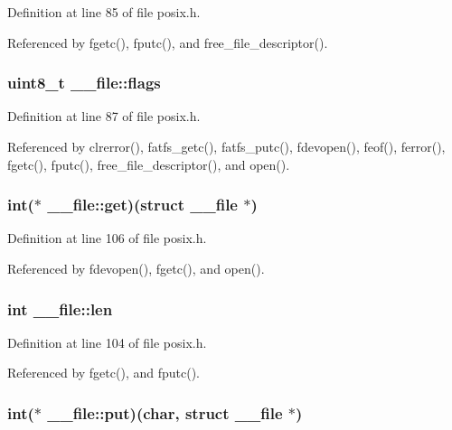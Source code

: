 Definition at line 85 of file posix.\-h.



Referenced by fgetc(), fputc(), and free\-\_\-file\-\_\-descriptor().

\hypertarget{struct____file_a8d11df8679502efee09740f97d7c277b}{
\subsubsection[{flags}]{\setlength{\rightskip}{0pt plus 5cm}uint8\-\_\-t \-\_\-\-\_\-file\-::flags}}\label{struct____file_a8d11df8679502efee09740f97d7c277b}


Definition at line 87 of file posix.\-h.



Referenced by clrerror(), fatfs\-\_\-getc(), fatfs\-\_\-putc(), fdevopen(), feof(), ferror(), fgetc(), fputc(), free\-\_\-file\-\_\-descriptor(), and open().

\hypertarget{struct____file_a467262b28adfee5f6fb6df42de293071}{
\subsubsection[{get}]{\setlength{\rightskip}{0pt plus 5cm}int($\ast$ \-\_\-\-\_\-file\-::get)(struct {\bf \-\_\-\-\_\-file} $\ast$)}}\label{struct____file_a467262b28adfee5f6fb6df42de293071}


Definition at line 106 of file posix.\-h.



Referenced by fdevopen(), fgetc(), and open().

\hypertarget{struct____file_a30309efd13a75ed510bb2370debafaf8}{
\subsubsection[{len}]{\setlength{\rightskip}{0pt plus 5cm}int \-\_\-\-\_\-file\-::len}}\label{struct____file_a30309efd13a75ed510bb2370debafaf8}


Definition at line 104 of file posix.\-h.



Referenced by fgetc(), and fputc().

\hypertarget{struct____file_ac30baaec720d36ed503f35ae50bcec13}{
\subsubsection[{put}]{\setlength{\rightskip}{0pt plus 5cm}int($\ast$ \-\_\-\-\_\-file\-::put)(char, struct {\bf \-\_\-\-\_\-file} $\ast$)}}\label{struct____file_ac30baaec720d36ed503f35ae50bcec13}


